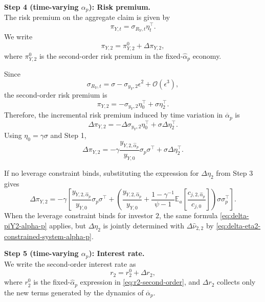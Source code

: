 \noindent\textbf{Step 4 (time-varying $\alpha_p$): Risk premium.}\\

The risk premium on the aggregate claim is given by
\begin{equation}
    \pi_{Y,t}=\sigma_{R_Y,t}\eta_t^\top.
\end{equation}
We write
\begin{equation}
    \pi_{Y,2}=\pi_{Y,2}^{0}+\Delta\pi_{Y,2},
\end{equation}
where $\pi_{Y,2}^{0}$ is the second-order risk premium in the fixed-$\hat{\alpha}_p$ economy.

Since
\begin{equation}
    \sigma_{R_Y,t}=\sigma-\sigma_{y_Y,2}\epsilon^2+\mathcal{O}(\epsilon^3),
\end{equation}
the second-order risk premium is
\begin{equation}
    \pi_{Y,2}=-\sigma_{y_Y,2}\eta_0^\top+\sigma\eta_2^\top.
\end{equation}
Therefore, the incremental risk premium induced by time variation in $\overline{\alpha}_p$ is
\begin{equation}\label{eq:delta-piY2-alpha-p}
    \Delta\pi_{Y,2}
    =-\Delta\sigma_{y_Y,2}\eta_0^\top+\sigma\Delta\eta_2^\top.
\end{equation}
Using $\eta_0=\gamma\sigma$ and Step 1,
\begin{equation}
    \Delta\pi_{Y,2}
    =-\gamma\frac{y_{Y,2,\hat{\alpha}_p}}{y_{Y,0}}\sigma_p\sigma^\top
    +\sigma\Delta\eta_2^\top.
\end{equation}

If no leverage constraint binds, substituting the expression for $\Delta\eta_2$ from Step 3 gives
\begin{equation}
    \Delta\pi_{Y,2}
    =-\gamma\left[
        \frac{y_{Y,2,\hat{\alpha}_p}}{y_{Y,0}}\sigma_p\sigma^\top
        +\left(
        \frac{y_{Y,2,\hat{\alpha}_p}}{y_{Y,0}}
        +\frac{1-\gamma^{-1}}{\psi-1}\mathbb{E}_a\left[\frac{c_{j,2,\hat{\alpha}_p}}{c_{j,0}}\right]
        \right)\sigma\sigma_p^\top
    \right].
\end{equation}
When the leverage constraint binds for investor $2$, the same formula \eqref{eq:delta-piY2-alpha-p} applies, but $\Delta\eta_2$ is jointly determined with $\Delta\hat{\nu}_{2,2}$ by \eqref{eq:delta-eta2-constrained-system-alpha-p}.

\noindent\textbf{Step 5 (time-varying $\alpha_p$): Interest rate.}\\
We write the second-order interest rate as
\begin{equation}
    r_2=r_2^{0}+\Delta r_2,
\end{equation}
where $r_2^{0}$ is the fixed-$\hat{\alpha}_p$ expression in \eqref{eq:r2-second-order}, and $\Delta r_2$ collects only the new terms generated by the dynamics of $\overline{\alpha}_p$.

